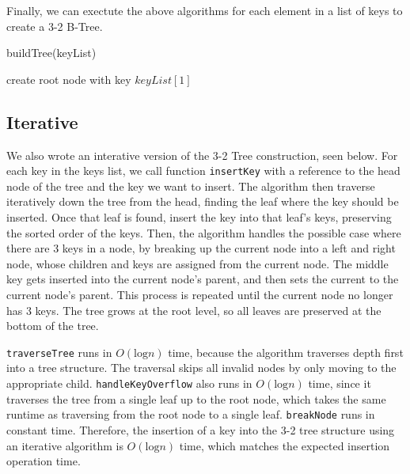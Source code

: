 \documentclass{article}
\begin{document}
\pagebreak

        Finally, we can exectute the above algorithms for each element in a list of keys to create a 3-2 B-Tree.

        \begin{function}
            \caption{buildTree(keyList)}
            \DontPrintSemicolon


            create root node with key $keyList[1]$\;

        \end{function}

    \subsection*{Iterative}

We also wrote an interative version of the 3-2 Tree construction, seen below. For each key in the keys list, we call function \texttt{insertKey} with a reference to the head node of the tree and the key we want to insert. The algorithm then traverse iteratively down the tree from the head, finding the leaf where the key should be inserted. Once that leaf is found, insert the key into that leaf's keys, preserving the sorted order of the keys. Then, the algorithm handles the possible case where there are 3 keys in a node, by breaking up the current node into a left and right node, whose children and keys are assigned from the current node. The middle key gets inserted into the current node's parent, and then sets the current to the current node's parent. This process is repeated until the current node no longer has 3 keys. The tree grows at the root level, so all leaves are preserved at the bottom of the tree.

\texttt{traverseTree} runs in $O(\text{log}n)$ time, because the algorithm traverses depth first into a tree structure. The traversal skips all invalid nodes by only moving to the appropriate child. \texttt{handleKeyOverflow} also runs in $O(\text{log}n)$ time, since it traverses the tree from a single leaf up to the root node, which takes the same runtime as traversing from the root node to a single leaf. \texttt{breakNode} runs in constant time. Therefore, the insertion of a key into the 3-2 tree structure using an iterative algorithm is $O(\text{log}n)$ time, which matches the expected insertion operation time.
\end{document}
